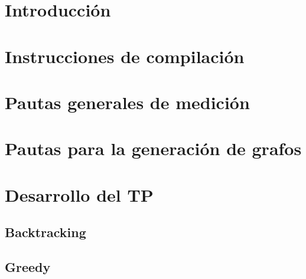 \documentclass[12pt, a4paper, twoside]{article}
\begin{document}
{}

\newpage{\pagestyle{empty}\cleardoublepage}
\setcounter{page}{1}

\newpage{\pagestyle{empty}\tableofcontents\cleardoublepage}

\begin{TP3}
\section{Introducción}\label{sec:introduccion}

\newpage
\section{Instrucciones de compilación}\label{sec:instrucciones}

\newpage

\section{Pautas generales de medición}\label{sec:medicion}

\newpage

\section{Pautas para la generación de grafos}\label{sec:generacion}

\newpage

\section{Desarrollo del TP}\label{sec:desarrollo}
  
  \subsection{Backtracking}\label{subsec:backtracking}
  
  \newpage

  \subsection{Greedy}\label{subsec:greedy}
  
  \newpage


\end{TP3}
\end{document}
